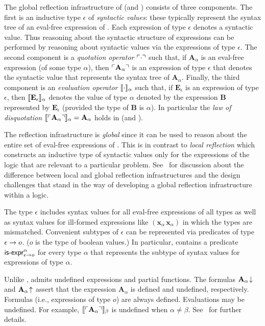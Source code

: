 \documentclass[fleqn]{llncs}
\begin{document}
The global reflection infrastructure of {\churchuqe} (and {\churchqe})
consists of three components.  The first is an inductive
type $\epsilon$ of \emph{syntactic values}: these
typically represent the syntax tree of an eval-free expression of
{\churchuqe}.  Each expression of type $\epsilon$ denotes a syntactic
value.  Thus reasoning about the syntactic structure of expressions
can be performed by reasoning about syntactic values via the
expressions of type $\epsilon$.  The second component is a
\emph{quotation operator} $\ulcorner\cdot\urcorner$ such that, if
$\textbf{A}_\alpha$ is an eval-free expression (of some type
$\alpha$), then $\ulcorner\textbf{A}_\alpha\urcorner$ is an expression of
type $\epsilon$ that denotes the syntactic value that represents the
syntax tree of $\textbf{A}_\alpha$.  Finally, the third component is an
\emph{evaluation operator} $\llbracket\cdot\rrbracket_\alpha$ such that, if
$\textbf{E}_\epsilon$ is an expression of type $\epsilon$, then
$\llbracket\textbf{E}_\epsilon\rrbracket_\alpha$ denotes the value of type
$\alpha$ denoted by the expression $\textbf{B}$ represented by
$\textbf{E}_\epsilon$ (provided the type of $\textbf{B}$ is $\alpha$).
In particular the \emph{law of disquotation}
$\llbracket\ulcorner\textbf{A}_\alpha\urcorner\rrbracket_\alpha = \textbf{A}_\alpha$
holds in {\churchuqe} (and {\churchqe}).

The reflection infrastructure is \emph{global} since it can be used to
reason about the entire set of eval-free expressions of {\churchuqe}.
This is in contrast to \emph{local reflection} which constructs an
inductive type of syntactic values only for the expressions of the logic that
are relevant to a particular problem.  See~\cite{Farmer18} for discussion about
the difference between local and global reflection infrastructures and the
design challenges that stand in the way of developing a global reflection
infrastructure within a logic.

The type $\epsilon$ includes syntax values for all eval-free
expressions of all types as well as syntax values for ill-formed
expressions like $(\textbf{x}_\alpha \, \textbf{x}_\alpha)$ in which
the types are mismatched.  Convenient subtypes of $\epsilon$ can be
represented via predicates of type $\epsilon \rightarrow o$.  ($o$ is the
type of boolean values.)  In particular, {\churchuqe} contains a
predicate $\mbox{\sf is-expr}^{\alpha}_{\epsilon \rightarrow o}$ for every type
$\alpha$ that represents the subtype of syntax values for expressions
of type $\alpha$.

Unlike {\churchqe}, {\churchuqe} admits undefined expressions and
partial functions.  The formulas $\textbf{A}_\alpha\!\downarrow$ and
$\textbf{A}_\alpha\!\uparrow$ assert that the expression
$\textbf{A}_\alpha$ is defined and undefined, respectively.  Formulas
(i.e., expressions of type $o$) are always defined.  Evaluations may
be undefined.  For example,
$\llbracket\ulcorner\textbf{A}_\alpha\urcorner\rrbracket_\beta$ is undefined when
$\alpha \not= \beta$.  See~\cite{Farmer08a,Farmer17} for further
details.
\end{document}
